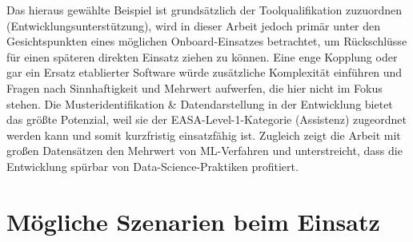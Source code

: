 Das hieraus gewählte Beispiel ist grundsätzlich der Toolqualifikation zuzuordnen (Entwicklungsunterstützung),
wird in dieser Arbeit jedoch primär unter den Gesichtspunkten eines möglichen Onboard-Einsatzes betrachtet,
um Rückschlüsse für einen späteren direkten Einsatz ziehen zu können. Eine enge Kopplung oder gar ein Ersatz
etablierter Software würde zusätzliche Komplexität einführen und Fragen nach Sinnhaftigkeit und Mehrwert aufwerfen,
die hier nicht im Fokus stehen. Die Musteridentifikation \& Datendarstellung in der Entwicklung bietet
das größte Potenzial, weil sie der EASA-Level-1-Kategorie (Assistenz) zugeordnet werden kann und somit kurzfristig
einsatzfähig ist. Zugleich zeigt die Arbeit mit großen Datensätzen den Mehrwert von ML-Verfahren und unterstreicht,
dass die Entwicklung spürbar von Data-Science-Praktiken profitiert.


\section{Mögliche Szenarien beim Einsatz}

